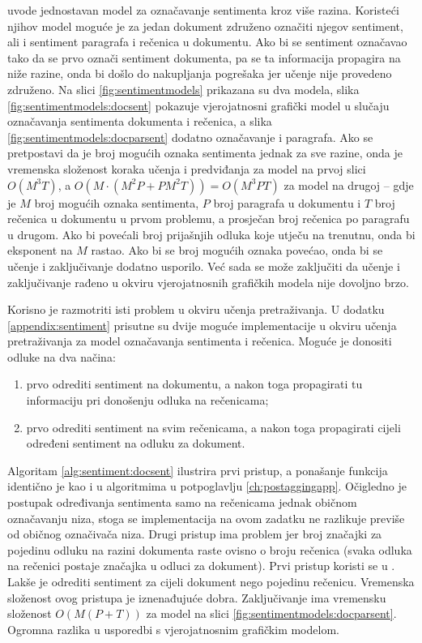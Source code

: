 \citet{mcdonald2007structured} uvode jednostavan model za označavanje sentimenta
kroz više razina. Koristeći njihov model moguće je za jedan dokument združeno
označiti njegov sentiment, ali i sentiment paragrafa i rečenica u dokumentu. Ako
bi se sentiment označavao tako da se prvo označi sentiment dokumenta, pa se ta
informacija propagira na niže razine, onda bi došlo do nakupljanja pogrešaka jer
učenje nije provedeno združeno. Na slici \ref{fig:sentimentmodels} prikazana su
dva modela, slika \ref{fig:sentimentmodels:docsent} pokazuje vjerojatnosni
grafički model u slučaju označavanja sentimenta dokumenta i rečenica, a slika
\ref{fig:sentimentmodels:docparsent} dodatno označavanje i paragrafa. Ako se
pretpostavi da je broj mogućih oznaka sentimenta jednak za sve razine, onda je
vremenska složenost koraka učenja i predviđanja za model na prvoj slici $O(M^3
T)$, a $O(M\cdot(M^2 P + P M^2 T))=O(M^3 P T)$ za model na drugoj -- gdje je $M$
broj mogućih oznaka sentimenta, $P$ broj paragrafa u dokumentu i $T$ broj
rečenica u dokumentu u prvom problemu, a prosječan broj rečenica po paragrafu u
drugom. Ako bi povećali broj prijašnjih odluka koje utječu na trenutnu,
onda bi eksponent na $M$ rastao. Ako bi se broj mogućih oznaka povećao, onda bi
se učenje i zaključivanje dodatno usporilo. Već sada se može zaključiti da
učenje i zaključivanje rađeno u okviru vjerojatnosnih grafičkih modela nije
dovoljno brzo.

Korisno je razmotriti isti problem u okviru učenja pretraživanja. U dodatku
\ref{appendix:sentiment} prisutne su dvije moguće implementacije u okviru učenja
pretraživanja za model označavanja sentimenta i rečenica. Moguće je donositi
odluke na dva načina:
\begin{enumerate}
  \item prvo odrediti sentiment na dokumentu, a nakon toga propagirati tu
  informaciju pri donošenju odluka na rečenicama;
  \item prvo odrediti sentiment na svim rečenicama, a nakon toga propagirati
  cijeli određeni sentiment na odluku za dokument.
\end{enumerate}
Algoritam \ref{alg:sentiment:docsent} ilustrira prvi pristup, a ponašanje
funkcija identično je kao i u algoritmima u potpoglavlju \ref{ch:postaggingapp}.
Očigledno je postupak određivanja sentimenta samo na rečenicama jednak običnom
označavanju niza, stoga se implementacija na ovom zadatku ne razlikuje previše
od običnog označivača niza. Drugi pristup ima problem jer broj značajki za
pojedinu odluku na razini dokumenta raste ovisno o broju rečenica (svaka odluka
na rečenici postaje značajka u odluci za dokument). Prvi pristup koristi se u
\citep{mcdonald2007structured}. Lakše je odrediti sentiment za cijeli dokument
nego pojedinu rečenicu. Vremenska složenost ovog pristupa je iznenađujuće dobra.
Zaključivanje ima vremensku složenost $O(M (P + T))$ za model na slici
\ref{fig:sentimentmodels:docparsent}. Ogromna razlika u usporedbi s
vjerojatnosnim grafičkim modelom.

